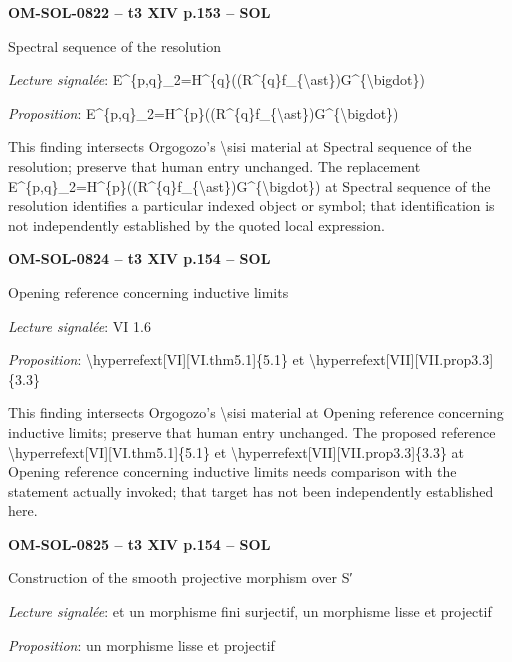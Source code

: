 \par\noindent\textbf{OM-SOL-0822 -- t3 XIV p.153 -- SOL}\par
Spectral sequence of the resolution\par
\emph{Lecture signalée}: E\textasciicircum{}\{p,q\}\_2=\allowbreak H\textasciicircum{}\{q\}((R\textasciicircum{}\{q\}f\_\{\textbackslash{}ast\})G\textasciicircum{}\{\textbackslash{}bigdot\})\par
\emph{Proposition}: E\textasciicircum{}\{p,q\}\_2=\allowbreak H\textasciicircum{}\{p\}((R\textasciicircum{}\{q\}f\_\{\textbackslash{}ast\})G\textasciicircum{}\{\textbackslash{}bigdot\})\par
This finding intersects Orgogozo's \textbackslash{}sisi material at Spectral sequence of the resolution; preserve that human entry unchanged. The replacement E\textasciicircum{}\{p,q\}\_2=\allowbreak H\textasciicircum{}\{p\}((R\textasciicircum{}\{q\}f\_\{\textbackslash{}ast\})G\textasciicircum{}\{\textbackslash{}bigdot\}) at Spectral sequence of the resolution identifies a particular indexed object or symbol; that identification is not independently established by the quoted local expression.\par
\par\noindent\textbf{OM-SOL-0824 -- t3 XIV p.154 -- SOL}\par
Opening reference concerning inductive limits\par
\emph{Lecture signalée}: VI 1.6\par
\emph{Proposition}: \textbackslash{}hyperrefext[VI][VI.thm5.1]\{5.1\} et \textbackslash{}hyperrefext[VII][VII.prop3.3]\{3.3\}\par
This finding intersects Orgogozo's \textbackslash{}sisi material at Opening reference concerning inductive limits; preserve that human entry unchanged. The proposed reference \textbackslash{}hyperrefext[VI][VI.thm5.1]\{5.1\} et \textbackslash{}hyperrefext[VII][VII.prop3.3]\{3.3\} at Opening reference concerning inductive limits needs comparison with the statement actually invoked; that target has not been independently established here.\par
\par\noindent\textbf{OM-SOL-0825 -- t3 XIV p.154 -- SOL}\par
Construction of the smooth projective morphism over S′\par
\emph{Lecture signalée}: et un morphisme fini surjectif, un morphisme lisse et projectif\par
\emph{Proposition}: un morphisme lisse et projectif\par
